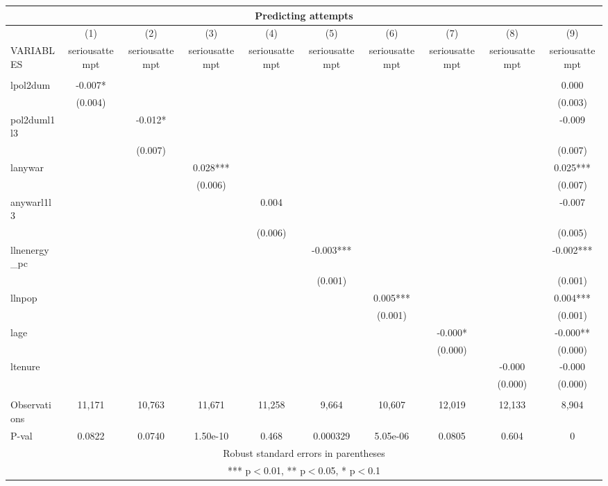\documentclass[]{article}
\begin{document}
\begin{tabular}{lccccccccc}
\multicolumn{10}{c}{Predicting attempts} \\ \hline
 & (1) & (2) & (3) & (4) & (5) & (6) & (7) & (8) & (9) \\
VARIABLES & seriousattempt & seriousattempt & seriousattempt & seriousattempt & seriousattempt & seriousattempt & seriousattempt & seriousattempt & seriousattempt \\ \hline
 &  &  &  &  &  &  &  &  &  \\
lpol2dum & -0.007* &  &  &  &  &  &  &  & 0.000 \\
 & (0.004) &  &  &  &  &  &  &  & (0.003) \\
pol2duml1l3 &  & -0.012* &  &  &  &  &  &  & -0.009 \\
 &  & (0.007) &  &  &  &  &  &  & (0.007) \\
lanywar &  &  & 0.028*** &  &  &  &  &  & 0.025*** \\
 &  &  & (0.006) &  &  &  &  &  & (0.007) \\
anywarl1l3 &  &  &  & 0.004 &  &  &  &  & -0.007 \\
 &  &  &  & (0.006) &  &  &  &  & (0.005) \\
llnenergy\_pc &  &  &  &  & -0.003*** &  &  &  & -0.002*** \\
 &  &  &  &  & (0.001) &  &  &  & (0.001) \\
llnpop &  &  &  &  &  & 0.005*** &  &  & 0.004*** \\
 &  &  &  &  &  & (0.001) &  &  & (0.001) \\
lage &  &  &  &  &  &  & -0.000* &  & -0.000** \\
 &  &  &  &  &  &  & (0.000) &  & (0.000) \\
ltenure &  &  &  &  &  &  &  & -0.000 & -0.000 \\
 &  &  &  &  &  &  &  & (0.000) & (0.000) \\
 &  &  &  &  &  &  &  &  &  \\
Observations & 11,171 & 10,763 & 11,671 & 11,258 & 9,664 & 10,607 & 12,019 & 12,133 & 8,904 \\
 P-val & 0.0822 & 0.0740 & 1.50e-10 & 0.468 & 0.000329 & 5.05e-06 & 0.0805 & 0.604 & 0 \\ \hline
\multicolumn{10}{c}{ Robust standard errors in parentheses} \\
\multicolumn{10}{c}{ *** p$<$0.01, ** p$<$0.05, * p$<$0.1} \\
\end{tabular}
\end{document}
